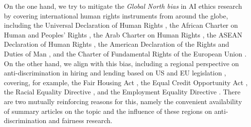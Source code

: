 On the one hand, we try to mitigate the \emph{Global North bias} in AI ethics research \citep{okolo2022making,roche2021artificial,septiandri2023weird} by covering international human rights instruments from around the globe, including the Universal Declaration of Human Rights \citep{un1948united}, the African Charter on Human and Peoples’ Rights \citep{oau1981african}, the  Arab Charter on Human Rights \citep{council2004arab}, the ASEAN Declaration of Human Rights \citep{asean2009association}, the American Declaration of the Rights and Duties of Man \citep{oas1948american}, and the Charter of Fundamental Rights of the European Union \citep{eu2000charter}.
On the other hand, we align with this bias, including a regional perspective on anti-discrimination in hiring and lending based on US and EU legislation \citep{fabris2023fairness,chen2019fairness}, covering, for example, the Fair Housing Act \citep{uscongress1968fha}, the Equal Credit Opportunity Act \citep{uscongress1974ecoa}, the Racial Equality Directive \citep{council2000council}, and the Employment Equality Directive \citep{council2000council2}. There are two mutually reinforcing reasons for this, namely the convenient availability of summary articles on the topic and the influence of these regions on anti-discrimination and fairness research. 


